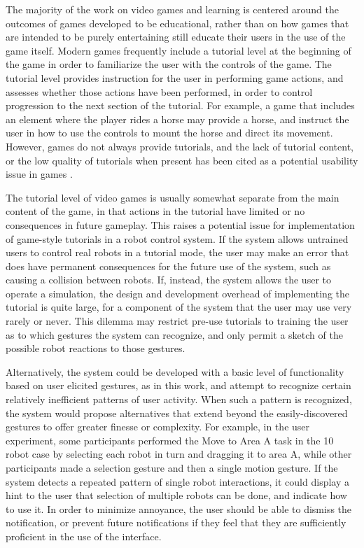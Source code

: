 The majority of the work on video games and learning is centered around the outcomes of games developed to be educational, rather than on how games that are intended to be purely entertaining still educate their users in the use of the game itself.
Modern games frequently include a tutorial level at the beginning of the game in order to familiarize the user with the controls of the game. 
The tutorial level provides instruction for the user in performing game actions, and assesses whether those actions have been performed, in order to control progression to the next section of the tutorial. 
For example, a game that includes an element where the player rides a horse may provide a horse, and instruct the user in how to use the controls to mount the horse and direct its movement. 
However, games do not always provide tutorials, and the lack of tutorial content, or the low quality of tutorials when present has been cited as a potential usability issue in games \citep{pinelle2008heuristic}.

The tutorial level of video games is usually somewhat separate from the main content of the game, in that actions in the tutorial have limited or no consequences in future gameplay. 
This raises a potential issue for implementation of game-style tutorials in a robot control system. 
If the system allows untrained users to control real robots in a tutorial mode, the user may make an error that does have permanent consequences for the future use of the system, such as causing a collision between robots. 
If, instead, the system allows the user to operate a simulation, the design and development overhead of implementing the tutorial is quite large, for a component of the system that the user may use very rarely or never. 
This dilemma may restrict pre-use tutorials to training the user as to which gestures the system can recognize, and only permit a sketch of the possible robot reactions to those gestures. 

Alternatively, the system could be developed with a basic level of functionality based on user elicited gestures, as in this work, and attempt to recognize certain relatively inefficient patterns of user activity. 
When such a pattern is recognized, the system would propose alternatives that extend beyond the easily-discovered gestures to offer greater finesse or complexity. 
For example, in the user experiment, some participants performed the Move to Area A task in the 10 robot case by selecting each robot in turn and dragging it to area A, while other participants made a selection gesture and then a single motion gesture. 
If the system detects a repeated pattern of single robot interactions, it could display a hint to the user that selection of multiple robots can be done, and indicate how to use it. 
In order to minimize annoyance, the user should be able to dismiss the notification, or prevent future notifications if they feel that they are sufficiently proficient in the use of the interface. 

